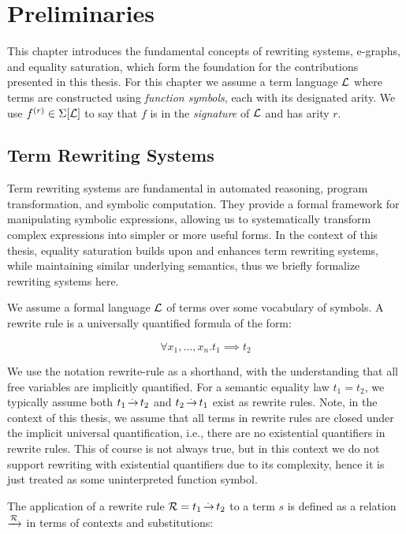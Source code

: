 \chapter{Preliminaries}
\label{chap:prelims}

This chapter introduces the fundamental concepts of rewriting systems, e-graphs, and equality saturation, which form the foundation for the contributions presented in this thesis. 
For this chapter we assume a term language $\mathcal{L}$ where terms are constructed using \emph{function symbols}, each with its designated arity.
We use $f^{(r)}\in\Sigma[\mathcal{L}]$ to say that $f$ is
in the \emph{signature} of $\mathcal{L}$ and has arity $r$.

\section{Term Rewriting Systems}
\label{prelim:term-rewriting}

Term rewriting systems are fundamental in automated reasoning, program transformation, and symbolic computation. 
They provide a formal framework for manipulating symbolic expressions, allowing us to systematically transform complex expressions into simpler or more useful forms. 
In the context of this thesis, equality saturation builds upon and enhances term rewriting systems, while maintaining similar underlying semantics, thus we briefly formalize rewriting systems here.

We assume a formal language $\mathcal{L}$ of terms over some vocabulary of symbols. 
A rewrite rule is a universally quantified formula of the form:

\[ \forall x_1, \ldots, x_n. t_1 \implies t_2 \]

We use the notation \gls{rewrite-rule} as a shorthand, with the understanding that all free variables are implicitly quantified.
For a semantic equality law $t_1 = t_2$, we typically assume both $t_1 \operatorname{\overset{.\,}{\rightarrow}} t_2$ and $t_2 \operatorname{\overset{.\,}{\rightarrow}} t_1$ exist as rewrite rules. 
Note, in the context of this thesis, we assume that all terms in rewrite rules are closed under the implicit universal quantification, i.e., there are no existential quantifiers in rewrite rules.
This of course is not always true, but in this context we do not support rewriting with existential quantifiers due to its complexity, hence it is just treated as some uninterpreted function symbol.

The application of a rewrite rule $\mathcal{R} = t_1 \operatorname{\overset{.\,}{\rightarrow}} t_2$ to a term $s$ is defined as a relation $\xrightarrow[]{\mathcal{R}}$ in terms of contexts and substitutions:

